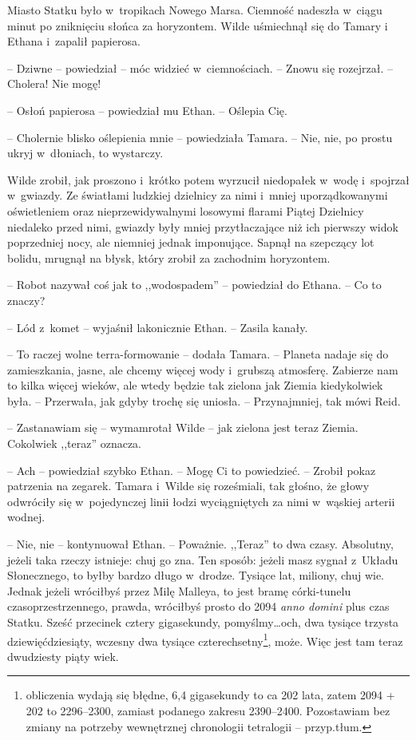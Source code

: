 \documentclass[oneside,polish,11pt,sfheadings]{mwbk}
\begin{document}
Miasto Statku było w~tropikach Nowego Marsa. Ciemność nadeszła w~ciągu
minut po zniknięciu słońca za horyzontem. Wilde uśmiechnął się do Tamary
i Ethana i~zapalił papierosa.

-- Dziwne -- powiedział -- móc widzieć w~ciemnościach. -- Znowu się
rozejrzał. -- Cholera! Nie mogę!

-- Osłoń papierosa -- powiedział mu Ethan. -- Oślepia Cię.

-- Cholernie blisko oślepienia mnie -- powiedziała Tamara. -- Nie, nie, po
prostu ukryj w~dłoniach, to wystarczy.

Wilde zrobił, jak proszono i~krótko potem wyrzucił niedopałek w~wodę i~spojrzał w~gwiazdy. Ze światłami ludzkiej dzielnicy za nimi i~mniej
uporządkowanymi oświetleniem oraz nieprzewidywalnymi losowymi flarami
Piątej Dzielnicy niedaleko przed nimi, gwiazdy były mniej przytłaczające
niż ich pierwszy widok poprzedniej nocy, ale niemniej jednak imponujące.
Sapnął na szepczący lot bolidu, mrugnął na błysk, który zrobił za
zachodnim horyzontem.

-- Robot nazywał coś jak to ,,wodospadem'' -- powiedział do Ethana. -- Co to
znaczy?

-- Lód z~komet -- wyjaśnił lakonicznie Ethan. -- Zasila kanały.

-- To raczej wolne terra-formowanie -- dodała Tamara. -- Planeta nadaje się
do zamieszkania, jasne, ale chcemy więcej wody i~grubszą atmosferę.
Zabierze nam to kilka więcej wieków, ale wtedy będzie tak zielona jak
Ziemia kiedykolwiek była. -- Przerwała, jak gdyby trochę się uniosła. -- Przynajmniej, tak mówi Reid.

-- Zastanawiam się -- wymamrotał Wilde -- jak zielona jest teraz Ziemia.
Cokolwiek ,,teraz'' oznacza.

-- Ach -- powiedział szybko Ethan. -- Mogę Ci to powiedzieć. -- Zrobił pokaz
patrzenia na zegarek. Tamara i~Wilde się roześmiali, tak głośno, że
głowy odwróciły się w~pojedynczej linii łodzi wyciągniętych za nimi w~wąskiej arterii wodnej.

-- Nie, nie -- kontynuował Ethan. -- Poważnie. ,,Teraz'' to dwa czasy.
Absolutny, jeżeli taka rzeczy istnieje: chuj go zna. Ten sposób: jeżeli
masz sygnał z~Układu Słonecznego, to byłby bardzo długo w~drodze.
Tysiące lat, miliony, chuj wie. Jednak jeżeli wróciłbyś przez Milę
Malleya, to jest bramę córki-tunelu czasoprzestrzennego, prawda,
wróciłbyś prosto do 2094 \emph{anno domini} plus czas Statku. Sześć
przecinek cztery gigasekundy, pomyślmy\ldots och, dwa tysiące trzysta
dziewięćdziesiąty, wczesny dwa tysiące czterechsetny\footnote{obliczenia wydają się błędne, 6,4 gigasekundy to ca 202 lata, zatem 2094 + 202 to 2296--2300, zamiast podanego zakresu 2390--2400. Pozostawiam bez zmiany na potrzeby wewnętrznej chronologii tetralogii -- przyp.tłum.}, może. Więc jest tam
teraz dwudziesty piąty wiek.
\end{document}
